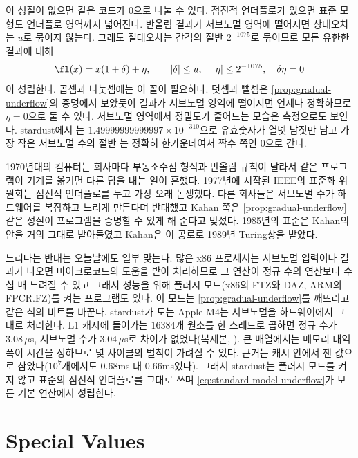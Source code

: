 이 성질이 없으면  같은 코드가 $0$으로 나눌 수 있다. 점진적 언더플로가 있으면 표준 모형도 언더플로 영역까지 넓어진다. 반올림 결과가 서브노멀 영역에 떨어지면 상대오차는 $u$로 묶이지 않는다. 그래도 절대오차는 간격의 절반 $2^{-1075}$로 묶이므로 모든 유한한 결과에 대해
\begin{equation}
\fl(x)=x(1+\delta)+\eta,\qquad|\delta|\le u,\quad|\eta|\le2^{-1075},\quad\delta\eta=0
\label{eq:standard-model-underflow}
\end{equation}
이 성립한다. 곱셈과 나눗셈에는 이 꼴이 필요하다. 덧셈과 뺄셈은 \cref{prop:gradual-underflow}의 증명에서 보았듯이 결과가 서브노멀 영역에 떨어지면 언제나 정확하므로 $\eta=0$으로 둘 수 있다. 서브노멀 영역에서 정밀도가 줄어드는 모습은 측정으로도 보인다. stardust에서 는 $1.49999999999997\times10^{-310}$으로 유효숫자가 열넷 남짓만 남고 가장 작은 서브노멀 수의 절반 는 정확히 한가운데여서 짝수 쪽인 $0$으로 간다.

1970년대의 컴퓨터는 회사마다 부동소수점 형식과 반올림 규칙이 달라서 같은 프로그램이 기계를 옮기면 다른 답을 내는 일이 흔했다. 1977년에 시작된 IEEE의 표준화 위원회는 점진적 언더플로를 두고 가장 오래 논쟁했다. 다른 회사들은 서브노멀 수가 하드웨어를 복잡하고 느리게 만든다며 반대했고 Kahan 쪽은 \cref{prop:gradual-underflow} 같은 성질이 프로그램을 증명할 수 있게 해 준다고 맞섰다\cite{coonen1981underflow}. 1985년의 표준은 Kahan의 안을 거의 그대로 받아들였고 Kahan은 이 공로로 1989년 Turing상을 받았다\cite{severance1998}.

느리다는 반대는 오늘날에도 일부 맞는다. 많은 x86 프로세서는 서브노멀 입력이나 결과가 나오면 마이크로코드의 도움을 받아 처리하므로 그 연산이 정규 수의 연산보다 수십 배 느려질 수 있고 그래서 성능을 위해 플러시 모드(x86의 FTZ와 DAZ, ARM의 FPCR.FZ)를 켜는 프로그램도 있다. 이 모드는 \cref{prop:gradual-underflow}를 깨뜨리고 같은 식의 비트를 바꾼다. stardust가 도는 Apple M4는 서브노멀을 하드웨어에서 그대로 처리한다. L1 캐시에 들어가는 $16384$개 원소를 한 스레드로 곱하면 정규 수가 $3.08\,\mu$s, 서브노멀 수가 $3.04\,\mu$s로 차이가 없었다(복제본, ). 큰 배열에서는 메모리 대역폭이 시간을 정하므로 몇 사이클의 벌칙이 가려질 수 있다. 근거는 캐시 안에서 잰 값으로 삼았다($10^7$개에서도 $0.68$ms 대 $0.66$ms였다). 그래서 stardust는 플러시 모드를 켜지 않고 표준의 점진적 언더플로를 그대로 쓰며 \cref{eq:standard-model-underflow}가 모든 기본 연산에서 성립한다.

\section{Special Values}
\label{sec:special-values}

